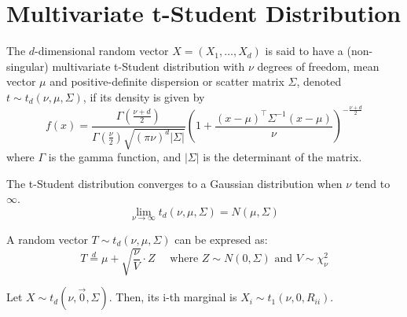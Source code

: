 \documentclass[11pt,fleqn]{book} %
\begin{document}

\section{Multivariate t-Student Distribution}
\label{ap:mtsd}

\begin{definition}
	The $d$-dimensional random vector $X=(X_1,\dots,X_d)$ is said to have a 
	(non-singular) multivariate t-Student distribution with $\nu$ degrees of freedom, 
	mean vector $\mu$ and positive-definite dispersion or scatter matrix $\Sigma$, 
	denoted $t \sim t_d(\nu,\mu,\Sigma)$, if its density is given by
	\begin{displaymath}
		f(x)=\frac{\Gamma\left(\frac{\nu+d}{2}\right)}{\Gamma\left(\frac{\nu}{2}\right)\sqrt{(\pi \nu)^d |\Sigma|}}
		\left(
		1+ \frac{(x-\mu)^\top\Sigma^{-1}(x-\mu)}{\nu}
		\right)^{-\frac{\nu+d}{2}}
	\end{displaymath}
	\noindent where $\Gamma$ is the gamma function, and $|\Sigma|$ is the 
	determinant of the matrix.
\end{definition}

\begin{proposition}
	The t-Student distribution converges to a Gaussian distribution 
	when $\nu$ tend to $\infty$.
	\begin{displaymath}
		\lim_{\nu \to \infty} t_d(\nu,\mu,\Sigma) = N(\mu,\Sigma)
	\end{displaymath}
\end{proposition}

\begin{proposition}
	\label{prop:mtschar}
	A random vector $T \sim t_d(\nu,\mu,\Sigma)$ can be expresed as:
	\begin{displaymath}
		T \stackrel{d}{=} \mu + \sqrt{\frac{\nu}{V}}\cdot Z
		\quad \text{ where } Z \sim N(0,\Sigma) \text{ and } V \sim \chi_{\nu}^2
	\end{displaymath}
\end{proposition}

\begin{proposition} \cite{kotz:2004}
	Let $X \sim t_d(\nu,\vec{0},\Sigma)$. Then, its i-th marginal is 
	$X_i \sim t_1(\nu,0,R_{ii})$.
\end{proposition}
\end{document}
